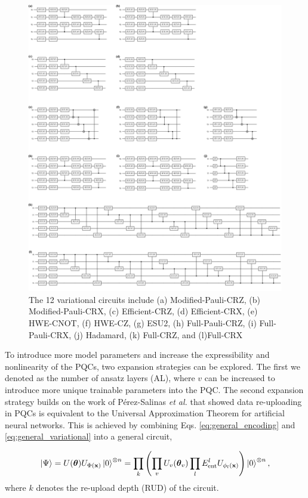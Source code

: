 \documentclass[journal=jacsat,manuscript=article]{achemso}
\begin{document}
\begin{figure}[H]
	\centering
	\includegraphics[width=\textwidth]{../images/ansatz/quantikz/combined.png}
	\caption{The 12 variational circuits include (a) Modified-Pauli-CRZ, (b) Modified-Pauli-CRX, (c) Efficient-CRZ, (d) Efficient-CRX, (e) HWE-CNOT, (f) HWE-CZ, (g) ESU2, (h) Full-Pauli-CRZ, (i) Full-Pauli-CRX, (j) Hadamard, (k) Full-CRZ, and (l)Full-CRX}
	\label{fig:ansatz}
\end{figure}


To introduce more model parameters and increase the expressibility and nonlinearity of the PQCs, two expansion strategies can be explored.
The first we denoted as the number of ansatz layers (AL), where $v$ can be increased to introduce more unique trainable parameters into the PQC.
The second expansion strategy builds on the work of P\'{e}rez-Salinas \textit{et al.} that showed data re-uploading in PQCs is equivalent to the Universal Approximation Theorem for artificial neural networks.\cite{perez-salinas_data_2020}
This is achieved by combining Eqs. \ref{eq:general_encoding} and \ref{eq:general_variational} into a general circuit,

\begin{equation}
	\ket{\Psi} = U(\bm{\theta}) U_{\Phi(\mathbf{x})}\ket{0}^{\otimes n} = \prod_{k}
	\left( \prod_{v} U_{v}(\bm{\theta}_{v}) \prod_{l} E_{\text{ent}}^{l} U_{\phi_{l}(\mathbf{x})} \right)  \ket{0}^{\otimes n},
\end{equation}
where $k$ denotes the re-upload depth (RUD) of the circuit.
\end{document}
